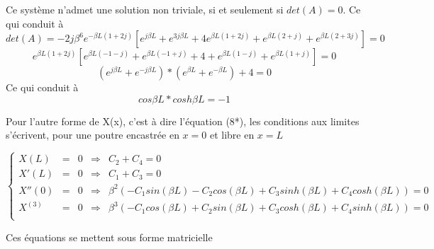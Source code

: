 \documentclass[a4paper,10pt]{article}
\begin{document}
Ce système n'admet une solution non triviale, si et seulement si \begin{math} det(A)=0 \end{math}. Ce qui conduit à 
\begin{equation} det(A) = -2j\beta^6 e^{-\beta L(1+2j)} [e^{j\beta L} + e^{3j\beta L} + 4e^{\beta L(1+2j)} + e^{\beta L (2+j)} + e^{\beta L(2+3j)} ] = 0     \end{equation}
\begin{equation}e^{\beta L(1+2j)} [ e^{\beta L (-1-j)} + e^{\beta L (-1+j)} + 4 + e^{\beta L(1-j)} + e^{\beta L(1+j)} ] = 0  \end{equation}
\begin{equation} (e^{j\beta L} + e^{-j\beta L})*(e^{\beta L}+e^{-\beta L})+4 = 0  \end{equation}
Ce qui conduit à 
\begin{equation} cos\beta L * cosh \beta L = -1  \end{equation}


Pour l'autre forme de X(x), c'est à dire l'équation (8*), les conditions aux limites s'écrivent, pour une poutre encastrée en \begin{math} x=0 \end{math} et libre en \begin{math} x=L \end{math}


\begin{equation} 
	\left\{
		\begin{aligned}
			X(L) 	&=& 	0  &\Rightarrow&  C_2   +  C_4 =  0 \\
			X'(L) 	&=&	0  &\Rightarrow&  C_1 + C_3  =  0\\
			X''(0)	&=&	0  &\Rightarrow&  \beta^2 ( -C_1 sin(\beta L)  - C_2 cos(\beta L)  +  C_3 sinh(\beta L)  + C_4 cosh(\beta L) ) =  0  \\
			X^{(3)} &=& 0  &\Rightarrow&  \beta^3 ( -C_1 cos(\beta L)  + C_2 sin(\beta L)  +  C_3 cosh(\beta L)  + C_4 sinh(\beta L) ) =  0  \\
		\end{aligned}	
	\right.
 \end{equation}

Ces équations se mettent sous forme matricielle
\end{document}
